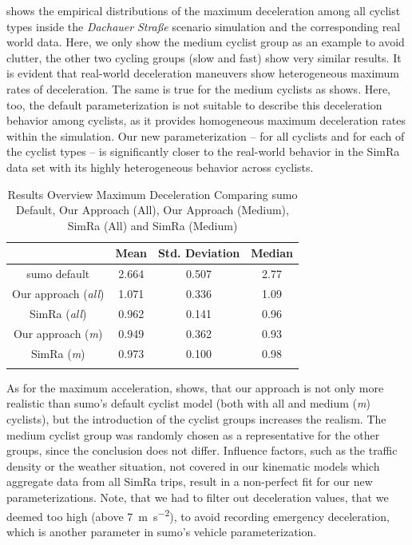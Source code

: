  shows the empirical distributions of the maximum deceleration among all cyclist types inside the \textit{Dachauer} \textit{Straße} scenario simulation and the corresponding real world data.
Here, we only show the medium cyclist group as an example to avoid clutter, the other two cycling groups (slow and fast) show very similar results.
It is evident that real-world deceleration maneuvers show heterogeneous maximum rates of deceleration.
The same is true for the medium cyclists as  shows.
Here, too, the default parameterization is not suitable to describe this deceleration behavior among cyclists, as it provides homogeneous maximum deceleration rates within the simulation.
Our new parameterization -- for all cyclists and for each of the cyclist types -- is significantly closer to the real-world behavior in the SimRa data set with its highly heterogeneous behavior across cyclists.
\begin{table}
\centering
\caption{Results Overview Maximum Deceleration Comparing \ac{sumo} Default, Our Approach (All), Our Approach (Medium), SimRa (All) and SimRa (Medium)}%
\label{tab:results_overview_dec}
\begin{tabular}{cccc}
\toprule
& Mean & Std. Deviation & Median\\
\midrule
\midrule
\ac{sumo} default & \num{2.664} & \num{0.507} & \num{2.77} \\
\midrule
Our approach (\textit{all}) & \num{1.071} & \num{0.336} & \num{1.09} \\
SimRa (\textit{all}) & \num{0.962} & \num{0.141} & \num{0.96} \\
\midrule
Our approach (\textit{m}) & \num{0.949} & \num{0.362} & \num{0.93} \\
SimRa (\textit{m}) & \num{0.973} & \num{0.100} & \num{0.98} \\
\bottomrule&
\end{tabular}
\end{table}
As for the maximum acceleration,  shows, that our approach is not only more realistic than \ac{sumo}'s default cyclist model (both with all and medium (\textit{m}) cyclists), but the introduction of the cyclist groups increases the realism.
The medium cyclist group was randomly chosen as a representative for the other groups, since the conclusion does not differ.
Influence factors, such as the traffic density or the weather situation, not covered in our kinematic models which aggregate data from all SimRa trips, result in a non-perfect fit for our new parameterizations.
Note, that we had to filter out deceleration values, that we deemed too high (above \SI{7}{\m\per\s\squared}), to avoid recording emergency deceleration, which is another parameter in \ac{sumo}'s vehicle parameterization.

